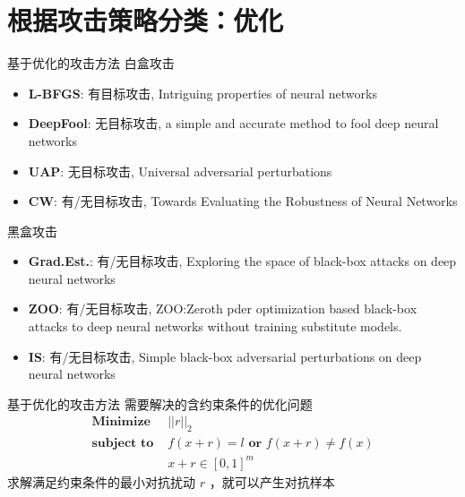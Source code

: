 \section{根据攻击策略分类：优化}


\begin{frame}{基于优化的攻击方法}
    白盒攻击
    \begin{itemize}
        \item \textbf{L-BFGS}: 有目标攻击, Intriguing properties of neural networks
        \item \textbf{DeepFool}: 无目标攻击, a simple and accurate method to fool deep neural networks
        \item \textbf{UAP}: 无目标攻击, Universal adversarial perturbations
        \item \textbf{CW}: 有/无目标攻击, Towards Evaluating the Robustness of Neural Networks
    \end{itemize}

    黑盒攻击
    \begin{itemize}
        \item \textbf{Grad.Est.}: 有/无目标攻击, Exploring the space of black-box attacks on deep neural networks
        \item \textbf{ZOO}: 有/无目标攻击, ZOO:Zeroth pder optimization based black-box attacks to deep neural networks without training substitute models.
        \item \textbf{IS}: 有/无目标攻击, Simple black-box adversarial perturbations on deep neural networks
    \end{itemize}
\end{frame}


\begin{frame}{基于优化的攻击方法}
    需要解决的含约束条件的优化问题
    \begin{equation}
        \begin{aligned}
            \textbf{Minimize }    & ||r||_2 \\
            \textbf{subject to }  & f(x+r)=l \textbf{ or } f(x+r)\neq f(x) \\
                                & x+r \in [0,1]^m
        \end{aligned}
    \end{equation}
    求解满足约束条件的最小对抗扰动 $r$ ，就可以产生对抗样本 
\end{frame}


